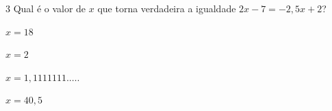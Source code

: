 








\num{3} Qual é o valor de $x$ que torna verdadeira a igualdade $2x - 7 = -2,5x + 2$?

\begin{multicols}{2}
\begin{escolha}[itemsep=0pt]
\item $x = 18$
\item $x = 2$
\item $x = 1,1111111.\ldots.$
\item $x = 40,5$
\end{escolha}
\end{multicols}









